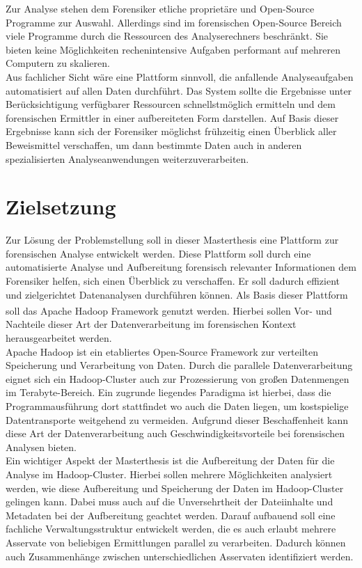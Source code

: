 \noindent
Zur Analyse stehen dem Forensiker etliche proprietäre und Open-Source Programme zur Auswahl. Allerdings sind im forensischen Open-Source Bereich viele Programme durch die Ressourcen des Analyserechners beschränkt. Sie bieten keine Möglichkeiten rechenintensive Aufgaben performant auf mehreren Computern zu skalieren.\\

\noindent
Aus fachlicher Sicht wäre eine Plattform sinnvoll, die anfallende Analyseaufgaben automatisiert auf allen Daten durchführt. Das System sollte die Ergebnisse unter Berücksichtigung verfügbarer Ressourcen schnellstmöglich ermitteln und dem forensischen Ermittler in einer aufbereiteten Form darstellen. Auf Basis dieser Ergebnisse kann sich der Forensiker möglichst frühzeitig einen Überblick aller Beweismittel verschaffen, um dann bestimmte Daten auch in anderen spezialisierten Analyseanwendungen weiterzuverarbeiten. 

\section{Zielsetzung}
Zur Lösung der Problemstellung soll in dieser Masterthesis eine Plattform zur forensischen Analyse entwickelt werden. Diese Plattform soll durch eine automatisierte Analyse und Aufbereitung forensisch relevanter Informationen dem Forensiker helfen, sich einen Überblick zu verschaffen. Er soll dadurch effizient und zielgerichtet Datenanalysen durchführen können. Als Basis dieser Plattform soll das Apache Hadoop\textsuperscript{\textregistered} Framework genutzt werden. Hierbei sollen Vor- und Nachteile dieser Art der Datenverarbeitung im forensischen Kontext herausgearbeitet werden.\\ 

\noindent
Apache Hadoop ist ein etabliertes Open-Source Framework zur verteilten Speicherung und Verarbeitung von Daten. Durch die parallele Datenverarbeitung eignet sich ein Hadoop-Cluster auch zur Prozessierung von großen Datenmengen im Terabyte-Bereich. Ein zugrunde liegendes Paradigma ist hierbei, dass die Programmausführung dort stattfindet wo auch die Daten liegen, um kostspielige Datentransporte weitgehend zu vermeiden. Aufgrund dieser Beschaffenheit kann diese Art der Datenverarbeitung auch Geschwindigkeitsvorteile bei forensischen Analysen bieten. \\

\noindent
Ein wichtiger Aspekt der Masterthesis ist die Aufbereitung der Daten für die Analyse im Hadoop-Cluster. Hierbei sollen mehrere Möglichkeiten analysiert werden, wie diese Aufbereitung und Speicherung der Daten im Hadoop-Cluster gelingen kann. Dabei muss auch auf die Unversehrtheit der Dateiinhalte und Metadaten bei der Aufbereitung geachtet werden. Darauf aufbauend soll eine fachliche Verwaltungsstruktur entwickelt werden, die es auch erlaubt mehrere Asservate von beliebigen Ermittlungen parallel zu verarbeiten. Dadurch können auch Zusammenhänge zwischen unterschiedlichen Asservaten identifiziert werden.\\

